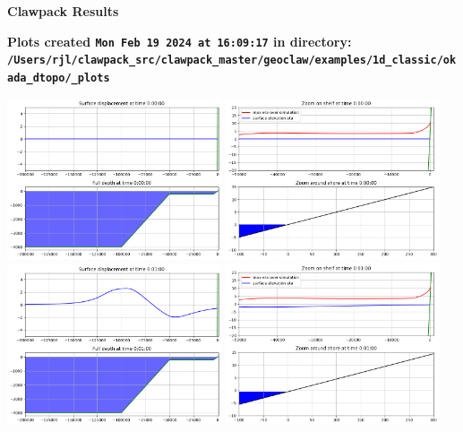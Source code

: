 \documentclass[11pt]{article}
\begin{document}
        \begin{center}{\Large\bf Clawpack Results}\vskip 5pt
        
        \bf Plots created {\tt Mon Feb 19 2024 at 16:09:17} in directory: \vskip 5pt
        \verb+/Users/rjl/clawpack_src/clawpack_master/geoclaw/examples/1d_classic/okada_dtopo/_plots+
        \end{center}
        \vskip 5pt
        \includegraphics[width=0.475\textwidth]{frame0000fig0.png}
\includegraphics[width=0.475\textwidth]{frame0000fig1.png}
\vskip 10pt 
\includegraphics[width=0.475\textwidth]{frame0001fig0.png}
\includegraphics[width=0.475\textwidth]{frame0001fig1.png}
\end{document}
